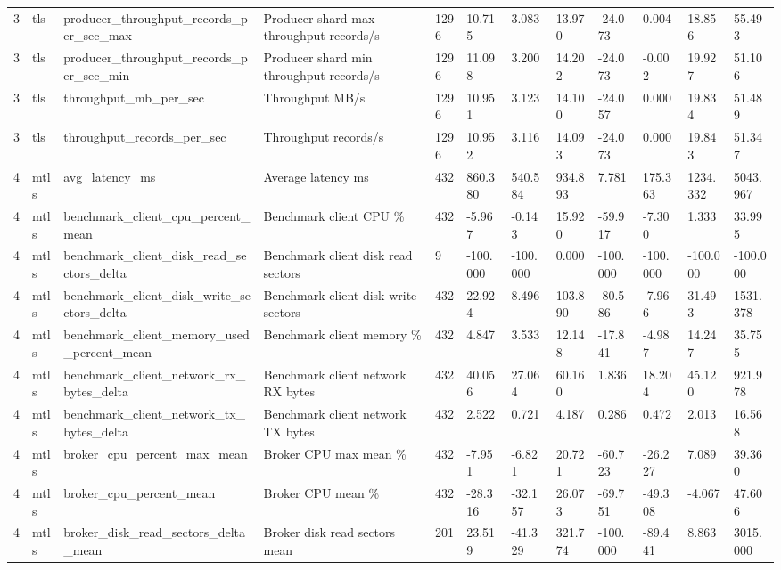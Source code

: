 \begin{longtable}{llllllllllll}
3 & tls & producer\_throughput\_records\_per\_sec\_max & Producer shard max throughput records/s & 1296 & 10.715 & 3.083 & 13.970 & -24.073 & 0.004 & 18.856 & 55.493 \\
3 & tls & producer\_throughput\_records\_per\_sec\_min & Producer shard min throughput records/s & 1296 & 11.098 & 3.200 & 14.202 & -24.073 & -0.002 & 19.927 & 51.106 \\
3 & tls & throughput\_mb\_per\_sec & Throughput MB/s & 1296 & 10.951 & 3.123 & 14.100 & -24.057 & 0.000 & 19.834 & 51.489 \\
3 & tls & throughput\_records\_per\_sec & Throughput records/s & 1296 & 10.952 & 3.116 & 14.093 & -24.073 & 0.000 & 19.843 & 51.347 \\
4 & mtls & avg\_latency\_ms & Average latency ms & 432 & 860.380 & 540.584 & 934.893 & 7.781 & 175.363 & 1234.332 & 5043.967 \\
4 & mtls & benchmark\_client\_cpu\_percent\_mean & Benchmark client CPU \% & 432 & -5.967 & -0.143 & 15.920 & -59.917 & -7.300 & 1.333 & 33.995 \\
4 & mtls & benchmark\_client\_disk\_read\_sectors\_delta & Benchmark client disk read sectors & 9 & -100.000 & -100.000 & 0.000 & -100.000 & -100.000 & -100.000 & -100.000 \\
4 & mtls & benchmark\_client\_disk\_write\_sectors\_delta & Benchmark client disk write sectors & 432 & 22.924 & 8.496 & 103.890 & -80.586 & -7.966 & 31.493 & 1531.378 \\
4 & mtls & benchmark\_client\_memory\_used\_percent\_mean & Benchmark client memory \% & 432 & 4.847 & 3.533 & 12.148 & -17.841 & -4.987 & 14.247 & 35.755 \\
4 & mtls & benchmark\_client\_network\_rx\_bytes\_delta & Benchmark client network RX bytes & 432 & 40.056 & 27.064 & 60.160 & 1.836 & 18.204 & 45.120 & 921.978 \\
4 & mtls & benchmark\_client\_network\_tx\_bytes\_delta & Benchmark client network TX bytes & 432 & 2.522 & 0.721 & 4.187 & 0.286 & 0.472 & 2.013 & 16.568 \\
4 & mtls & broker\_cpu\_percent\_max\_mean & Broker CPU max mean \% & 432 & -7.951 & -6.821 & 20.721 & -60.723 & -26.227 & 7.089 & 39.360 \\
4 & mtls & broker\_cpu\_percent\_mean & Broker CPU mean \% & 432 & -28.316 & -32.157 & 26.073 & -69.751 & -49.308 & -4.067 & 47.606 \\
4 & mtls & broker\_disk\_read\_sectors\_delta\_mean & Broker disk read sectors mean & 201 & 23.519 & -41.329 & 321.774 & -100.000 & -89.441 & 8.863 & 3015.000 \\

\end{longtable}
